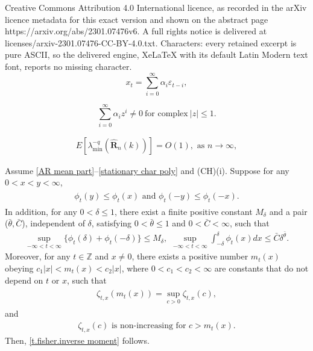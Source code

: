 \documentclass[10pt,a4paper]{amsart}
\begin{document}
Creative Commons Attribution 4.0 International licence, as recorded in the arXiv licence metadata for this exact version and shown on the abstract page https://arxiv.org/abs/2301.07476v6. A full rights notice is delivered at licenses/arxiv-2301.07476-CC-BY-4.0.txt. Characters: every retained excerpt is pure ASCII, so the delivered engine, XeLaTeX with its default Latin Modern text font, reports no missing character.
\begin{equation}\label{AR mean part}
x_t=\sum_{i=0}^{\infty}\alpha_i\varepsilon_{t-i},
\end{equation}

\begin{equation}\label{stationary char poly}
\sum_{i=0}^{\infty}\alpha_iz^i\neq0\ \textrm{for complex}\ |z|\leq1.
\end{equation}

\begin{eqnarray}
\label{t.fisher.inverse moment}
E[\lambda_{\min}^{-q}(\hat{\mathbf{R}}_n(k))]=O(1), \,\, \mbox{as}\,\, n \to \infty,
\end{eqnarray}

\begin{theorem}\label{tfisher}
Assume \eqref{AR mean part}--\eqref{stationary char poly}
and {\rm (CH)(i)}. 
Suppose for any 
$0< x< y<\infty$, %
\begin{align}\label{zt density}
\begin{split}
\phi_t(y)\leq \phi_t(x)\,\,\mbox{and}\,\,\phi_t(-y)\leq \phi_t(-x).
\end{split}
\end{align}
In addition, 
for any $0<\delta \leq 1$, there exist a
finite positive constant $M_\delta$
and a pair ($\bar{\theta} ,\bar{C} $), independent of $\delta$, satisfying $0<\bar{\theta} \leq 1$ and $0<\bar{C}<\infty$,
such that
\begin{eqnarray}
\label{ing104}
\sup_{-\infty<t<\infty}\{\phi_t(\delta)+\phi_t(-\delta)\}\leq M_\delta,\,\,\sup_{-\infty<t<\infty}
\int_{-\delta}^{\delta}\phi_t(x)dx\leq\bar{C}\delta^{\bar{\theta}}.
\end{eqnarray}
Moreover, for any $t\in \mathbb{Z}$ and $x \neq 0$, there exists
a positive number $m_t(x)$ obeying $c_1|x| < m_t(x)< c_2|x|$, 
where $0<c_1<c_2<\infty$ are constants that do not depend on $t$ or $x$, such that
\begin{align}
\begin{split}
\label{zt density 0}
\zeta_{t,x}(m_t(x))=\sup_{c>0} \zeta_{t,x}(c),
\end{split}
\end{align}
and 
\begin{equation}
\label{zt density 2}
\begin{split}
\zeta_{t,x}(c) \,\,\mbox{is non-increasing for} \,\,
c>m_t(x).
\end{split}
\end{equation}
Then, \eqref{t.fisher.inverse moment} follows.
\end{theorem}
\end{document}
